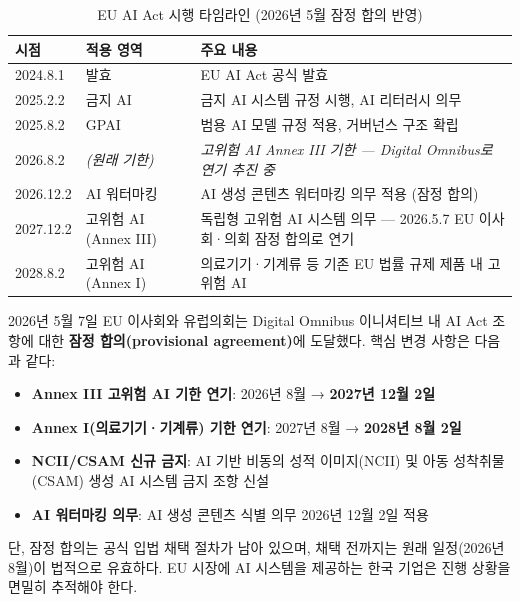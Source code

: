 \begin{table}[htbp]
\centering
\caption{EU AI Act 시행 타임라인 (2026년 5월 잠정 합의 반영)}
\label{tab:eu_ai_act_timeline_global}
\begin{tabularx}{\textwidth}{p{2.5cm}p{3.2cm}X}
\toprule
\textbf{시점} & \textbf{적용 영역} & \textbf{주요 내용} \\
\midrule
2024.8.1 & 발효 & EU AI Act 공식 발효 \\
2025.2.2 & 금지 AI & 금지 AI 시스템 규정 시행, AI 리터러시 의무 \\
2025.8.2 & GPAI & 범용 AI 모델 규정 적용, 거버넌스 구조 확립 \\
2026.8.2 & \textit{(원래 기한)} & \textit{고위험 AI Annex III 기한 — Digital Omnibus로 연기 추진 중} \\
2026.12.2 & AI 워터마킹 & AI 생성 콘텐츠 워터마킹 의무 적용 (잠정 합의) \\
2027.12.2 & 고위험 AI (Annex III) & 독립형 고위험 AI 시스템 의무 — 2026.5.7 EU 이사회·의회 잠정 합의로 연기 \\
2028.8.2 & 고위험 AI (Annex I) & 의료기기·기계류 등 기존 EU 법률 규제 제품 내 고위험 AI \\
\bottomrule
\end{tabularx}
\end{table}

\begin{tcolorbox}[colback=orange!5, colframe=orange!60, title={2026년 5월 최신 동향: EU AI Act Digital Omnibus}]
2026년 5월 7일 EU 이사회와 유럽의회는 Digital Omnibus 이니셔티브 내 AI Act 조항에 대한 \textbf{잠정 합의(provisional agreement)}에 도달했다. 핵심 변경 사항은 다음과 같다:
\begin{itemize}
    \item \textbf{Annex III 고위험 AI 기한 연기}: 2026년 8월 → \textbf{2027년 12월 2일}
    \item \textbf{Annex I(의료기기·기계류) 기한 연기}: 2027년 8월 → \textbf{2028년 8월 2일}
    \item \textbf{NCII/CSAM 신규 금지}: AI 기반 비동의 성적 이미지(NCII) 및 아동 성착취물(CSAM) 생성 AI 시스템 금지 조항 신설
    \item \textbf{AI 워터마킹 의무}: AI 생성 콘텐츠 식별 의무 2026년 12월 2일 적용
\end{itemize}
단, 잠정 합의는 공식 입법 채택 절차가 남아 있으며, 채택 전까지는 원래 일정(2026년 8월)이 법적으로 유효하다. EU 시장에 AI 시스템을 제공하는 한국 기업은 진행 상황을 면밀히 추적해야 한다.
\end{tcolorbox}

